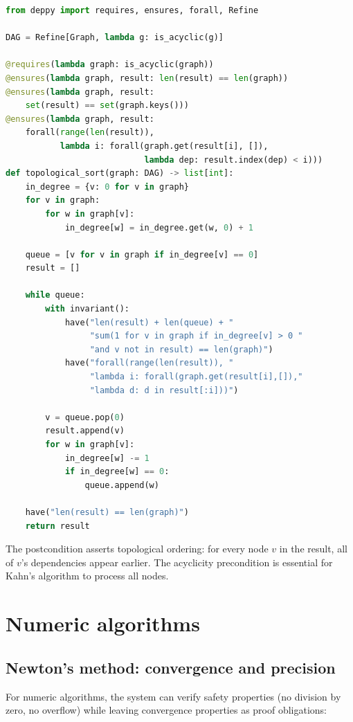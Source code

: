 \documentclass[11pt]{report}
\theoremstyle{definition}
\theoremstyle{plain}
\begin{document}
\begin{lstlisting}[style=deppy,language=Python]
from deppy import requires, ensures, forall, Refine

DAG = Refine[Graph, lambda g: is_acyclic(g)]

@requires(lambda graph: is_acyclic(graph))
@ensures(lambda graph, result: len(result) == len(graph))
@ensures(lambda graph, result:
    set(result) == set(graph.keys()))
@ensures(lambda graph, result:
    forall(range(len(result)),
           lambda i: forall(graph.get(result[i], []),
                            lambda dep: result.index(dep) < i)))
def topological_sort(graph: DAG) -> list[int]:
    in_degree = {v: 0 for v in graph}
    for v in graph:
        for w in graph[v]:
            in_degree[w] = in_degree.get(w, 0) + 1

    queue = [v for v in graph if in_degree[v] == 0]
    result = []

    while queue:
        with invariant():
            have("len(result) + len(queue) + "
                 "sum(1 for v in graph if in_degree[v] > 0 "
                 "and v not in result) == len(graph)")
            have("forall(range(len(result)), "
                 "lambda i: forall(graph.get(result[i],[]),"
                 "lambda d: d in result[:i]))")

        v = queue.pop(0)
        result.append(v)
        for w in graph[v]:
            in_degree[w] -= 1
            if in_degree[w] == 0:
                queue.append(w)

    have("len(result) == len(graph)")
    return result
\end{lstlisting}

The postcondition asserts topological ordering: for every node $v$ in the
result, all of $v$'s dependencies appear earlier. The acyclicity precondition
is essential for Kahn's algorithm to process all nodes.

\section{Numeric algorithms}

\subsection{Newton's method: convergence and precision}

For numeric algorithms, the system can verify safety properties (no division
by zero, no overflow) while leaving convergence properties as proof
obligations:
\end{document}
